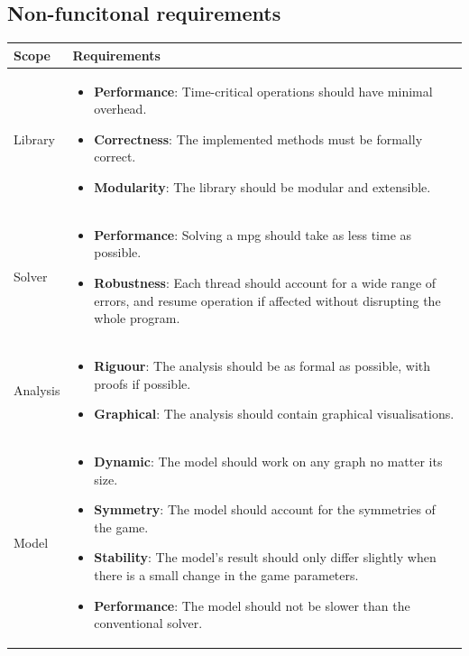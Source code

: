 \subsection{Non-funcitonal requirements}
\begin{table}[h]
	\begin{tabularx}{\textwidth}{| p{3cm} | X |}
		\hline
		
		Scope & Requirements  \\
		\hline
		Library & \begin{itemize}
			\item \textbf{Performance}: Time-critical operations should have minimal overhead.
			\item \textbf{Correctness}: The implemented methods must be formally correct.
			\item \textbf{Modularity}: The library should be modular and extensible. 
		\end{itemize}\\
		\hline
		Solver & \begin{itemize}
			\item \textbf{Performance}: Solving a \acrshort{mpg} should take as less time as possible.
			\item \textbf{Robustness}: Each thread should account for a wide range of errors, and resume operation if affected without disrupting the whole program.
		\end{itemize} \\
		\hline
		Analysis & \begin{itemize}
			\item \textbf{Riguour}: The analysis should be as formal as possible, with proofs if possible.
			\item \textbf{Graphical}: The analysis should contain graphical visualisations.
		\end{itemize}\\
		\hline
		Model &\begin{itemize}
			\item \textbf{Dynamic}: The model should work on any graph no matter its size.
			\item \textbf{Symmetry}: The model should account for the symmetries of the game.
			\item \textbf{Stability}: The model's result should only differ slightly when there is a small change in the game parameters.
			\item \textbf{Performance}: The model should not be slower than the conventional solver.
		\end{itemize} \\

\end{tabularx}
\end{table}
